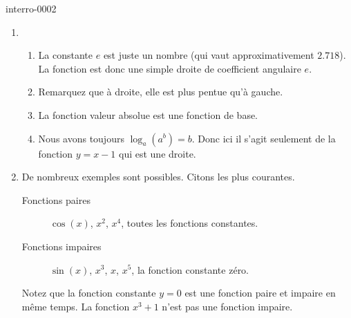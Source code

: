 
\begin{corrige}{interro-0002}

%


\begin{enumerate}
	\item
		\begin{enumerate}
			\item
				La constante $e$ est juste un nombre (qui vaut approximativement $2.718$). La fonction est donc une simple droite de coefficient angulaire $e$.
			\item
				Remarquez que à droite, elle est plus pentue qu'à gauche.
			\item
				La fonction valeur absolue est une fonction de base.
			\item
				Nous avons toujours $\log_a(a^b)=b$. Donc ici il s'agit seulement de la fonction $y=x-1$ qui est une droite.
		\end{enumerate}
	\item
		De nombreux exemples sont possibles. Citons les plus courantes.
		\begin{description}
			\item[Fonctions paires] $\cos(x)$, $x^2$, $x^4$, toutes les fonctions constantes.
			\item[Fonctions impaires] $\sin(x)$, $x^3$, $x$, $x^5$, la fonction constante zéro.
		\end{description}
		Notez que la fonction constante $y=0$ est une fonction paire et impaire en même temps. La fonction $x^3+1$ n'est pas une fonction impaire.

\end{enumerate}


\end{corrige}

